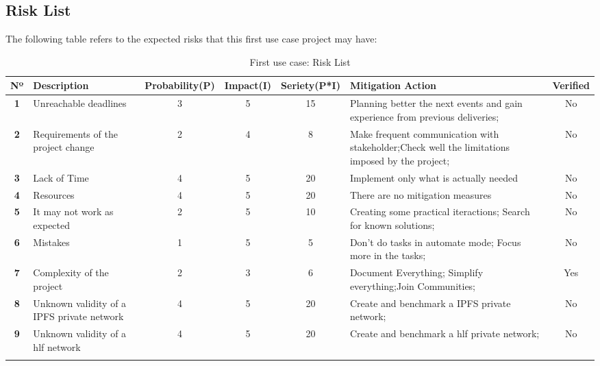\subsection{Risk List}
The following table refers to the expected risks that this first use case project may have:
\begin{longtable}{|c|p{3cm}|c|c|c|p{3cm}|c|} 
	
	\hline
	\textbf{Nº} & 
	\textbf{Description} & 
	\textbf{Probability(P)} & 
	\textbf{Impact(I)} & 
	\textbf{Seriety(P*I)} & 
	\textbf{Mitigation Action} & 
	\textbf{Verified}  
	\\ \hline
	\endfirsthead
	
	\hline
	\textbf{1} 
	& 
	Unreachable deadlines
	& 3 
	& 5 
	& 15 
	& Planning better the next events and gain experience from previous deliveries;
	& No
	\\ \hline
	
	\textbf{2} 
	& 
	Requirements of the project change
	& 2 
	& 4 
	& 8 
	& Make frequent communication with stakeholder;Check well the limitations imposed by the project;
	& No
	\\ \hline
	
	\textbf{3} 
	& 
	Lack of Time
	& 4 
	& 5 
	& 20 
	& Implement only what is actually needed
	& No
	\\ \hline
	
	\textbf{4} 
	& 
	Resources
	& 4 
	& 5 
	& 20 
	& There are no mitigation measures
	& No
	\\ \hline
	
	\textbf{5} 
	& 
	It may not work as expected
	& 2 
	& 5 
	& 10 
	& Creating some practical iteractions; Search for known solutions;
	& No
	\\ \hline
	
	\textbf{6} 
	& 
	Mistakes
	& 1 
	& 5 
	& 5 
	& Don't do tasks in automate mode; Focus more in the tasks;
	& No
	\\ \hline
	
	
	\textbf{7} 
	& 
	Complexity of the project
	& 2 
	& 3 
	& 6 
	& Document Everything; Simplify everything;Join Communities;
	& Yes
	\\ \hline
	
	\textbf{8} 
	& 
	Unknown validity of a IPFS private network
	& 4 
	& 5 
	& 20 
	& Create and benchmark a IPFS private network;
	& No
	\\ \hline
	\textbf{9}
	& 
	Unknown validity of a hlf network
	& 4 
	& 5 
	& 20 
	& Create and benchmark a hlf private network;
	& No
	\\ \hline
	
	\caption{First use case: Risk List} \label{tab:activity_schedule} 
	
\end{longtable}

